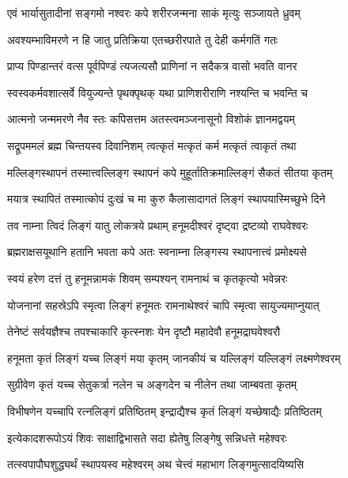 \twolineshloka
{एवं भार्यासुतादीनां सङ्गमो नश्वरः कपे}
{शरीरजन्मना साकं मृत्युः सञ्जायते ध्रुवम्}%

\twolineshloka
{अवश्यम्भाविमरणे न हि जातु प्रतिक्रिया}
{एतच्छरीरपाते तु देही कर्मगतिं गतः}%

\twolineshloka
{प्राप्य पिण्डान्तरं वत्स पूर्वपिण्डं त्यजत्यसौ}
{प्राणिनां न सदैकत्र वासो भवति वानर}%

\twolineshloka
{स्वस्वकर्मवशात्सर्वे वियुज्यन्ते पृथक्पृथक्}
{यथा प्राणिशरीराणि नश्यन्ति च भवन्ति च}%

\twolineshloka
{आत्मनो जन्ममरणे नैव स्तः कपिसत्तम}
{अतस्त्वमञ्जनासूनो विशोकं ज्ञानमद्वयम्}%

\twolineshloka
{सद्रूपममलं ब्रह्म चिन्तयस्व दिवानिशम्}
{त्वत्कृतं मत्कृतं कर्म मत्कृतं त्वाकृतं तथा}%

\twolineshloka
{मल्लिङ्गस्थापनं तस्मात्त्वल्लिङ्ग स्थापनं कपे}
{मुहूर्तातिक्रमाल्लिङ्गं सैकतं सीतया कृतम्}%

\twolineshloka
{मयात्र स्थापितं तस्मात्कोपं दुःखं च मा कुरु}
{कैलासादागतं लिङ्गं स्थापयास्मिच्छुभे दिने}%

\twolineshloka
{तव नाम्ना त्विदं लिङ्गं यातु लोकत्रये प्रथाम्}
{हनूमदीश्वरं दृष्ट्वा द्रष्टव्यो राघवेश्वरः}%

\twolineshloka
{ब्रह्मराक्षसयूथानि हतानि भवता कपे}
{अतः स्वनाम्ना लिङ्गस्य स्थापनात्त्वं प्रमोक्ष्यसे}%

\twolineshloka
{स्वयं हरेण दत्तं तु हनूमन्नामकं शिवम्}
{सम्पश्यन् रामनाथं च कृतकृत्यो भवेन्नरः}%

\twolineshloka
{योजनानां सहस्रेऽपि स्मृत्वा लिङ्गं हनूमतः}
{रामनाथेश्वरं चापि स्मृत्वा सायुज्यमाप्नुयात्}%

\twolineshloka
{तेनेष्टं सर्वयज्ञैश्च तपश्चाकारि कृत्स्नशः}
{येन दृष्टौ महादेवौ हनूमद्राघवेश्वरौ}%

\twolineshloka
{हनूमता कृतं लिङ्गं यच्च लिङ्गं मया कृतम्}
{जानकीयं च यल्लिङ्गं यल्लिङ्गं लक्ष्मणेश्वरम्}%

\twolineshloka
{सुग्रीवेण कृतं यच्च सेतुकर्त्रा नलेन च}
{अङ्गदेन च नीलेन तथा जाम्बवता कृतम्}%

\twolineshloka
{विभीषणेन यच्चापि रत्नलिङ्गं प्रतिष्ठितम्}
{इन्द्राद्यैश्च कृतं लिङ्गं यच्छेषाद्यैः प्रतिष्ठितम्}%

\twolineshloka
{इत्येकादशरूपोऽयं शिवः साक्षाद्विभासते}
{सदा ह्येतेषु लिङ्गेषु सन्निधत्ते महेश्वरः}%

\twolineshloka
{तत्स्वपापौघशुद्ध्यर्थं स्थापयस्व महेश्वरम्}
{अथ चेत्त्वं महाभाग लिङ्गमुत्सादयिष्यसि}%

